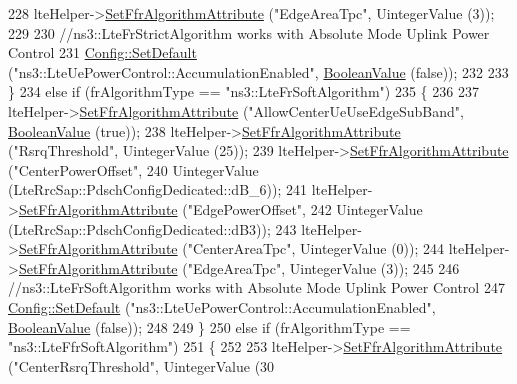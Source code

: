 \begin{DoxyCode}
228       lteHelper->\hyperlink{classns3_1_1LteHelper_a793d56e843a844428851e90752c5f130}{SetFfrAlgorithmAttribute} (\textcolor{stringliteral}{"EdgeAreaTpc"}, UintegerValue (3));
229 
230       \textcolor{comment}{//ns3::LteFrStrictAlgorithm works with Absolute Mode Uplink Power Control}
231       \hyperlink{group__config_ga2e7882df849d8ba4aaad31c934c40c06}{Config::SetDefault} (\textcolor{stringliteral}{"ns3::LteUePowerControl::AccumulationEnabled"}, 
      \hyperlink{classns3_1_1BooleanValue}{BooleanValue} (\textcolor{keyword}{false}));
232 
233     \}
234   \textcolor{keywordflow}{else} \textcolor{keywordflow}{if} (frAlgorithmType == \textcolor{stringliteral}{"ns3::LteFrSoftAlgorithm"})
235     \{
236 
237       lteHelper->\hyperlink{classns3_1_1LteHelper_a793d56e843a844428851e90752c5f130}{SetFfrAlgorithmAttribute} (\textcolor{stringliteral}{"AllowCenterUeUseEdgeSubBand"}, 
      \hyperlink{classns3_1_1BooleanValue}{BooleanValue} (\textcolor{keyword}{true}));
238       lteHelper->\hyperlink{classns3_1_1LteHelper_a793d56e843a844428851e90752c5f130}{SetFfrAlgorithmAttribute} (\textcolor{stringliteral}{"RsrqThreshold"}, UintegerValue (25));
239       lteHelper->\hyperlink{classns3_1_1LteHelper_a793d56e843a844428851e90752c5f130}{SetFfrAlgorithmAttribute} (\textcolor{stringliteral}{"CenterPowerOffset"},
240                                            UintegerValue (LteRrcSap::PdschConfigDedicated::dB\_6));
241       lteHelper->\hyperlink{classns3_1_1LteHelper_a793d56e843a844428851e90752c5f130}{SetFfrAlgorithmAttribute} (\textcolor{stringliteral}{"EdgePowerOffset"},
242                                            UintegerValue (LteRrcSap::PdschConfigDedicated::dB3));
243       lteHelper->\hyperlink{classns3_1_1LteHelper_a793d56e843a844428851e90752c5f130}{SetFfrAlgorithmAttribute} (\textcolor{stringliteral}{"CenterAreaTpc"}, UintegerValue (0));
244       lteHelper->\hyperlink{classns3_1_1LteHelper_a793d56e843a844428851e90752c5f130}{SetFfrAlgorithmAttribute} (\textcolor{stringliteral}{"EdgeAreaTpc"}, UintegerValue (3));
245 
246       \textcolor{comment}{//ns3::LteFrSoftAlgorithm works with Absolute Mode Uplink Power Control}
247       \hyperlink{group__config_ga2e7882df849d8ba4aaad31c934c40c06}{Config::SetDefault} (\textcolor{stringliteral}{"ns3::LteUePowerControl::AccumulationEnabled"}, 
      \hyperlink{classns3_1_1BooleanValue}{BooleanValue} (\textcolor{keyword}{false}));
248 
249     \}
250   \textcolor{keywordflow}{else} \textcolor{keywordflow}{if} (frAlgorithmType == \textcolor{stringliteral}{"ns3::LteFfrSoftAlgorithm"})
251     \{
252 
253       lteHelper->\hyperlink{classns3_1_1LteHelper_a793d56e843a844428851e90752c5f130}{SetFfrAlgorithmAttribute} (\textcolor{stringliteral}{"CenterRsrqThreshold"}, UintegerValue (30

\end{DoxyCode}
